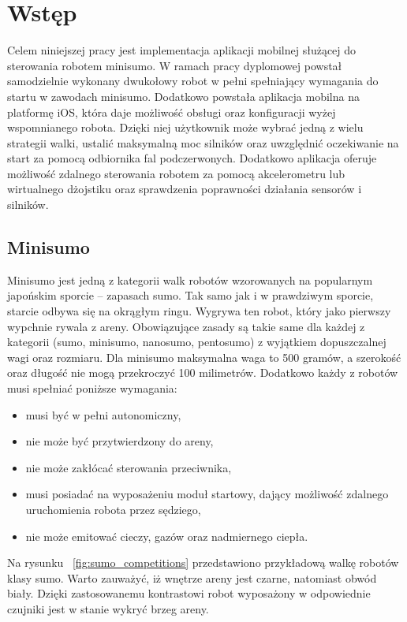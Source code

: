 \chapter{Wstęp}
Celem niniejszej pracy jest implementacja aplikacji mobilnej służącej do sterowania robotem minisumo. W ramach pracy dyplomowej powstał samodzielnie wykonany dwukołowy robot w pełni spełniający wymagania do startu w zawodach minisumo. Dodatkowo powstała aplikacja mobilna na platformę iOS, która daje możliwość obsługi oraz konfiguracji wyżej wspomnianego robota. Dzięki niej użytkownik może wybrać jedną z wielu strategii walki, ustalić maksymalną moc silników oraz uwzględnić oczekiwanie na start za pomocą odbiornika fal podczerwonych. Dodatkowo aplikacja oferuje możliwość zdalnego sterowania robotem za pomocą akcelerometru lub wirtualnego dżojstiku oraz sprawdzenia poprawności działania sensorów i silników. 

\section{Minisumo}
Minisumo jest jedną z kategorii walk robotów wzorowanych na popularnym japońskim sporcie – zapasach sumo. Tak samo jak i w prawdziwym sporcie, starcie odbywa się na okrągłym ringu. Wygrywa ten robot, który jako pierwszy wypchnie rywala z areny. Obowiązujące zasady są takie same dla każdej z kategorii (sumo, minisumo, nanosumo, pentosumo) z wyjątkiem dopuszczalnej wagi oraz rozmiaru. Dla minisumo maksymalna waga to 500 gramów, a szerokość oraz długość nie mogą przekroczyć 100 milimetrów. Dodatkowo każdy z robotów musi spełniać 
poniższe wymagania:
\begin{itemize}
\item musi być w pełni autonomiczny,
\item nie może być przytwierdzony do areny,
\item nie może zakłócać sterowania przeciwnika,
\item musi posiadać na wyposażeniu moduł startowy, dający możliwość zdalnego uruchomienia robota przez sędziego,
\item nie może emitować cieczy, gazów oraz nadmiernego ciepła.
\end{itemize}

Na rysunku ~\ref{fig:sumo_competitions} przedstawiono przykładową walkę robotów klasy sumo. Warto zauważyć, iż  wnętrze areny jest czarne, natomiast obwód biały. Dzięki zastosowanemu kontrastowi robot wyposażony w odpowiednie czujniki jest w stanie wykryć brzeg areny.

